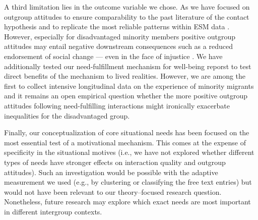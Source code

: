 \documentclass[man, 12pt, a4paper, mask]{apa7}
\theoremstyle{break}
\theoremstyle{plain}
\providecommand{\DIFaddbegin}{} %
\providecommand{\DIFaddend}{} %
\providecommand{\DIFdelbegin}{} %
\providecommand{\DIFdelend}{} %
\newcommand{\DIFscaledelfig}{0.5}
\newlength{\DIFdelgraphicswidth} %
\newlength{\DIFdelgraphicsheight} %
\newcommand{\DIFaddincludegraphics}[2][]{{\color{blue}\fbox{\DIFOincludegraphics[#1]{#2}}}} %
\newcommand{\DIFdelincludegraphics}[2][]{%
\sbox{\DIFdelgraphicsbox}{\DIFOincludegraphics[#1]{#2}}%
\settoboxwidth{\DIFdelgraphicswidth}{\DIFdelgraphicsbox} %
\settoboxtotalheight{\DIFdelgraphicsheight}{\DIFdelgraphicsbox} %
\scalebox{\DIFscaledelfig}{%
\parbox[b]{\DIFdelgraphicswidth}{\usebox{\DIFdelgraphicsbox}\\[-\baselineskip] \rule{\DIFdelgraphicswidth}{0em}}\llap{\resizebox{\DIFdelgraphicswidth}{\DIFdelgraphicsheight}{%
\setlength{\unitlength}{\DIFdelgraphicswidth}%
\begin{picture}(1,1)%
\thicklines\linethickness{2pt} %
{\color[rgb]{1,0,0}\put(0,0){\framebox(1,1){}}}%
{\color[rgb]{1,0,0}\put(0,0){\line( 1,1){1}}}%
{\color[rgb]{1,0,0}\put(0,1){\line(1,-1){1}}}%
\end{picture}%
}\hspace*{3pt}}} %
} %
\DeclareRobustCommand{\DIFaddbegin}{\DIFOaddbegin \let\includegraphics\DIFaddincludegraphics} %
\DeclareRobustCommand{\DIFaddend}{\DIFOaddend \let\includegraphics\DIFOincludegraphics} %
\DeclareRobustCommand{\DIFdelbegin}{\DIFOdelbegin \let\includegraphics\DIFdelincludegraphics} %
\DeclareRobustCommand{\DIFdelend}{\DIFOaddend \let\includegraphics\DIFOincludegraphics} %
\begin{document}
A third limitation lies in the outcome variable we chose. As we have focused on outgroup attitudes to ensure comparability to the past literature of the contact hypothesis and to replicate the most reliable patterns within ESM data \DIFdelbegin %
\DIFdelend \DIFaddbegin \citep[][]{Pettigrew2006}\DIFaddend . However, especially for disadvantaged minority members positive outgroup attitudes may entail negative downstream consequences such as a reduced endorsement of social change --- even in the face of injustice \citep[e.g.,][]{dixon2012}. We have additionally tested our need-fulfillment mechanism for well-being reporst to test direct benefits of the mechanism to lived realities. However, we are among the first to collect intensive longitudinal data on the experience of minority migrants and it remains an open empirical question whether the more positive outgroup attitudes following need-fulfilling interactions might ironically exacerbate inequalities for the disadvantaged group. 

Finally, our conceptualization of core situational needs has been focused on the most essential test of a motivational mechanism. This comes at the expense of specificity in the situational motives (i.e., we have not explored whether different types of needs have stronger effects on interaction quality and outgroup attitudes). Such an investigation would be possible with the adaptive measurement we used (e.g., by clustering or classifying the free text entries) but would not have been relevant to our theory–focused research question. Nonetheless, future research may explore which exact needs are most important in different intergroup contexts. 
\end{document}
